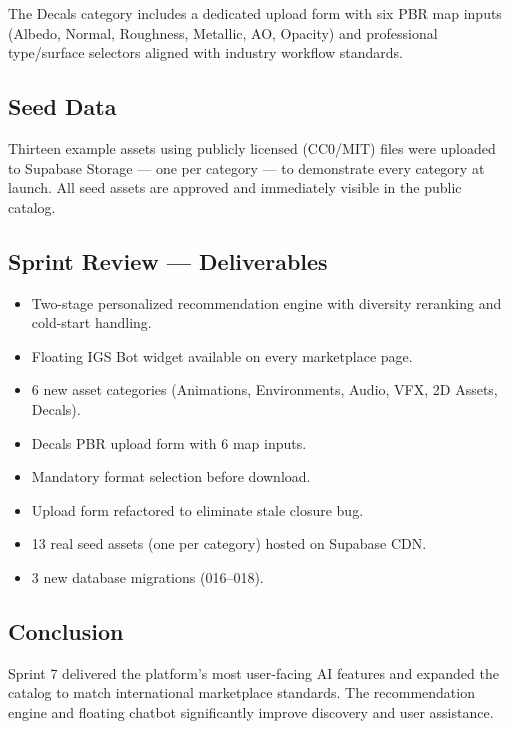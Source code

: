 The Decals category includes a dedicated upload form with six PBR map inputs (Albedo, Normal, Roughness, Metallic, AO, Opacity) and professional type/surface selectors aligned with industry workflow standards.

\subsection{Seed Data}

Thirteen example assets using publicly licensed (CC0/MIT) files were uploaded to Supabase Storage — one per category — to demonstrate every category at launch. All seed assets are approved and immediately visible in the public catalog.

\subsection{Sprint Review --- Deliverables}

\begin{itemize}
  \item Two-stage personalized recommendation engine with diversity reranking and cold-start handling.
  \item Floating IGS Bot widget available on every marketplace page.
  \item 6 new asset categories (Animations, Environments, Audio, VFX, 2D Assets, Decals).
  \item Decals PBR upload form with 6 map inputs.
  \item Mandatory format selection before download.
  \item Upload form refactored to eliminate stale closure bug.
  \item 13 real seed assets (one per category) hosted on Supabase CDN.
  \item 3 new database migrations (016--018).
\end{itemize}

\subsection*{Conclusion}
Sprint 7 delivered the platform's most user-facing AI features and expanded the catalog to match international marketplace standards. The recommendation engine and floating chatbot significantly improve discovery and user assistance.
